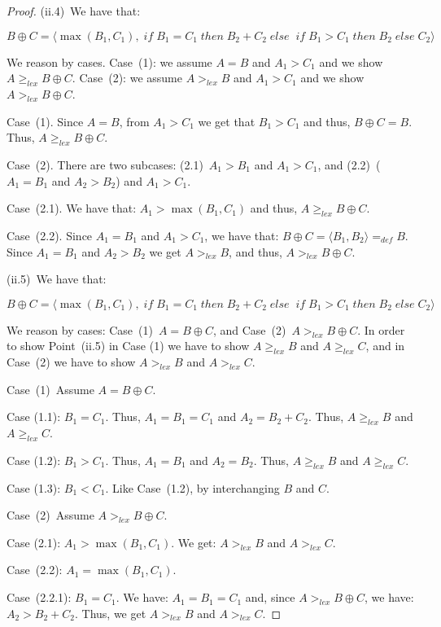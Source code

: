 \documentclass[english]{tlp}
\newcommand{\gel}{\geq_{\mathit{lex}}}
\newcommand{\gl}{>_{\mathit{lex}}}
\newcommand{\bif}{\;{\mathit{if}}\;}
\newcommand{\bth}{\;{\mathit{then}}\;}
\newcommand{\bel}{\;{\mathit{else}}\;}
\renewcommand{\mathit}{\displaystyle}
\begin{document}
\begin{proof}
\medskip
\noindent(ii.4)~We have that:

$B\oplus C=\langle \max(B_1,C_1), \bif B_1=C_1\bth B_2\!+\!C_2 
\bel \bif B_1>C_1 \bth B_2 \bel C_2\rangle$

\noindent
We reason by cases. Case~(1): we assume $A=B$ and $A_1>C_1$
and we show $A\gel B \oplus C$. Case~(2):  we assume $A\gl B$ and $A_1>C_1$
and we show $A\gl B \oplus C$.

\smallskip

\noindent
Case~(1). Since $A=B$, from $A_1>C_1$ we get that $B_1>C_1$ and thus, $B \oplus C=B$.
Thus, $A\gel B \oplus C$.

\smallskip
\noindent
Case~(2). There are two subcases: (2.1)~$A_1>B_1$ and $A_1>C_1$, and
(2.2)~($A_1=B_1$ and $A_2>B_2$) and $A_1>C_1$.

\noindent
Case~(2.1). We have that: $A_1>\max(B_1,C_1)$ and thus, $A\gel B \oplus C$.

\noindent
Case~(2.2). Since $A_1=B_1$ and $A_1>C_1$, we have that: $B \oplus C=\langle B_1,B_2 \rangle=_{\mathit{def}}B$. Since
$A_1=B_1$ and $A_2>B_2$ we get $A\gl B$, and thus, $A\gl B \oplus C$.




\medskip
\noindent(ii.5)~We have that:

$B\oplus C=\langle \max(B_1,C_1), \bif B_1=C_1\bth B_2\!+\!C_2 
\bel \bif B_1>C_1 \bth B_2 \bel C_2\rangle$

\noindent
We reason by cases: Case~(1)~$A=B\oplus C$, and Case~(2)~$A\gl B\oplus C$.
In order to show Point~(ii.5) in Case (1) we have to show 
$A\gel B$  and $A\gel C$,
and in Case~(2) we have to show $A\gl B$  and $A\gl C$.

\smallskip
\noindent
Case~(1)~Assume $A=B\oplus C$. 

\noindent Case (1.1): $B_1=C_1$. Thus, $A_1=B_1=C_1$
and $A_2=B_2+C_2$. Thus, $A\gel B$  and $A\gel C$.

\noindent
Case (1.2): $B_1>C_1$. Thus, $A_1=B_1$
and $A_2=B_2$. Thus, $A\gel B$  and $A\gel C$.

\noindent
Case (1.3): $B_1<C_1$. Like Case~(1.2), by interchanging
$B$ and $C$. 

\smallskip
\noindent
Case~(2)~Assume $A\gl B\oplus C$. 

\noindent Case (2.1): $A_1>\max(B_1,C_1)$. 
We get: $A\gl B$  and $A\gl C$. 

\noindent Case~(2.2): $A_1=\max(B_1,C_1)$.

\noindent 
Case~(2.2.1): $B_1=C_1$. We have:  $A_1=B_1=C_1$ and, since $A\gl B\oplus C$, 
we have: $A_2>B_2+C_2$. Thus, we get $A\gl B$  and $A\gl C$. 


\end{proof}
\end{document}
